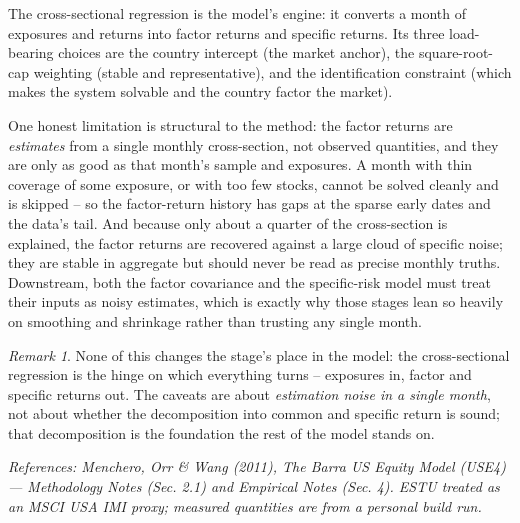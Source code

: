 \documentclass[11pt]{article}
\theoremstyle{definition}
\theoremstyle{plain}
\theoremstyle{remark}
\newtheorem*{remark}{Remark}
\begin{document}
\begin{keyresult}
The cross-sectional regression is the model's engine: it converts a month of exposures and returns into factor returns and specific returns. Its three load-bearing choices are the country intercept (the market anchor), the square-root-cap weighting (stable and representative), and the identification constraint (which makes the system solvable and the country factor the market).
\end{keyresult}

\begin{pitfall}
One honest limitation is structural to the method: the factor returns are \emph{estimates} from a single monthly cross-section, not observed quantities, and they are only as good as that month's sample and exposures. A month with thin coverage of some exposure, or with too few stocks, cannot be solved cleanly and is skipped -- so the factor-return history has gaps at the sparse early dates and the data's tail. And because only about a quarter of the cross-section is explained, the factor returns are recovered against a large cloud of specific noise; they are stable in aggregate but should never be read as precise monthly truths. Downstream, both the factor covariance and the specific-risk model must treat their inputs as noisy estimates, which is exactly why those stages lean so heavily on smoothing and shrinkage rather than trusting any single month.
\end{pitfall}

\begin{remark}
None of this changes the stage's place in the model: the cross-sectional regression is the hinge on which everything turns -- exposures in, factor and specific returns out. The caveats are about \emph{estimation noise in a single month}, not about whether the decomposition into common and specific return is sound; that decomposition is the foundation the rest of the model stands on.
\end{remark}

\begin{center}\small\itshape
References: Menchero, Orr \& Wang (2011), \textit{The Barra US Equity Model (USE4)} --- Methodology Notes (Sec. 2.1) and Empirical Notes (Sec. 4). ESTU treated as an MSCI USA IMI proxy; measured quantities are from a personal build run.
\end{center}
\end{document}
